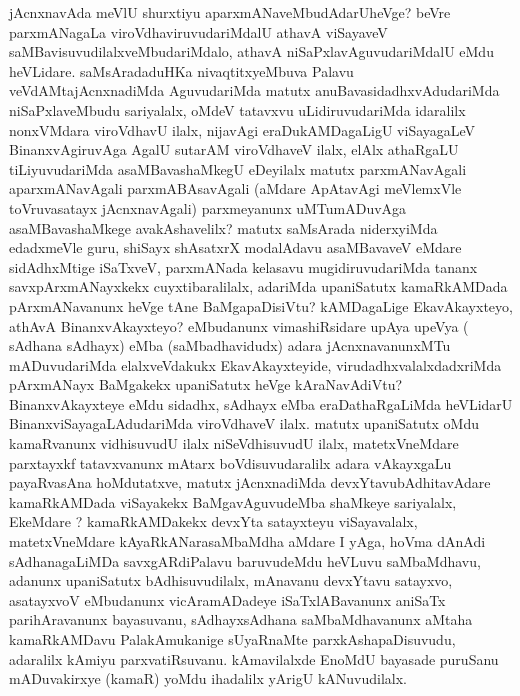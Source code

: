 \centerline{}


\begin{artha}
jAcnxnavAda meVlU shurxtiyu aparxmANaveMbudAdarUheVge? beVre
parxmANa\-gaLa viroVdhaviruvudariMdalU athavA viSayaveV
saMBavisuvudilalxveMbuda\break\-riMdalo, athavA niSaPxlavAguvudariMdalU eMdu
heVLidare. saMsAradaduHKa nivaqtitxyeMbuva Palavu veVdAMtajAcnxnadiMda
AguvudariMda matutx anuBavasidadhx\-vAdudariMda niSaPxlaveMbudu
sariyalalx, oMdeV tatavxvu uLidiruvudariMda \-idaralilx nonxVMdara
viroVdhavU ilalx, nijavAgi eraDukAMDagaLigU viSayagaLeV
Binanx\-vAgiruvAga AgalU sutarAM viroVdhaveV ilalx, elAlx athaRgaLU
tiLiyuvu\-dariMda asaMBavashaMkegU eDeyilalx matutx parxmANavAgali
aparxmANavAgali \-parxmABAsavAgali (aMdare ApAtavAgi meVlemxVle
toVruvasatayx jAcnxnavAgali) parxmeyanunx uMTumADuvAga
asaMBavashaMkege avakAshavelilx? matutx saMsArada niderxyiMda
edadxmeVle guru, shiSayx shAsatxrX modalAdavu asaMBavaveV eMdare
\break sidAdhxMtige iSaTxveV, parxmANada kelasavu mugidiruvudariMda tananx
savxpArxmANayxkekx cuyxtibaralilalx, adariMda upaniSatutx kamaRkAMDada
pArxmANavanunx heVge tAne BaMgapaDisiVtu? kAMDagaLige EkavAkayxteyo,
athAvA BinanxvAkayxteyo? eMbu\-danunx vimashiRsidare upAya upeVya (
sAdhana sAdhayx) eMba (saMbadhavidudx) adara jAcnxnavanunxMTu
mADuvudariMda elalxveVdakukx EkavAkayxteyide, virudadhxvalalxdadx\-riMda
pArxmANayx BaMgakekx upaniSatutx heVge kAraNavAdiVtu?
BinanxvAkayxteye eMdu sidadhx, sAdhayx eMba eraDathaRgaLiMda heVLidarU
BinanxviSayagaLAdudariMda \break viroVdhaveV ilalx. matutx upaniSatutx oMdu
kamaRvanunx vidhisuvudU ilalx niSeVdhi\-suvudU ilalx, matetxVneMdare
parxtayxkf tatavxvanunx mAtarx boVdisuvudaralilx adara vAkayxgaLu
payaRvasAna hoMdutatxve, matutx jAcnxnadiMda devxYtavubAdhitavAdare
kamaR\-kAMDada viSayakekx BaMgavAguvudeMba shaMkeye sariyalalx, EkeMdare
? kamaR\-kAMDakekx devxYta satayxteyu viSayavalalx, matetxVneMdare
kAyaRkANarasaMbaMdha \-aMdare I yAga, hoVma dAnAdi sAdhanagaLiMDa
savxgARdiPalavu baruvudeMdu heVLuvu saMbaMdhavu, adanunx upaniSatutx
bAdhisuvudilalx, mAnavanu devxYtavu satayxvo, \-asatayxvoV eMbudanunx
vicAramADadeye iSaTxlABavanunx aniSaTx parihAravanunx bayasuvanu,
sAdhayxsAdhana saMbaMdhavanunx aMtaha kamaRkAMDavu PalakAmukanige
sUyaRnaMte parxkAshapaDisuvudu, adaralilx  kAmiyu parxvatiRsuvanu.
\-kAmavilalxde EnoMdU bayasade puruSanu mADuvakirxye (kamaR) yoMdu
ihadalilx \break yArigU kANuvudilalx.
\end{artha}

